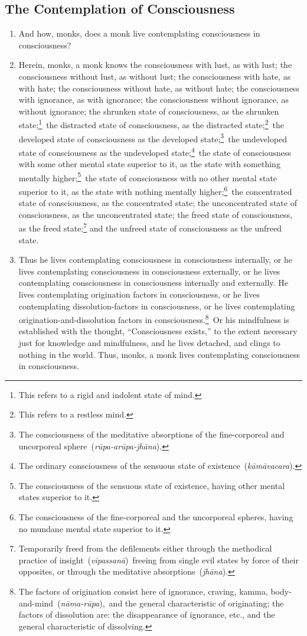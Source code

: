 \documentclass[a4 paper, 12pt]{article}
\begin{document}
\subsection*{The Contemplation of Consciousness}
\begin{enumerate}[resume]
\item And how, monks, does a monk live contemplating consciousness in consciousness?
\item Herein, monks, a monk knows the consciousness with lust, as with lust; the consciousness without lust, as without lust; the consciousness with hate, as with hate; the consciousness without hate, as without hate; the consciousness with ignorance, as with ignorance; the consciousness without ignorance, as without ignorance; the shrunken state of consciousness, as the shrunken state;\footnote{This refers to a rigid and indolent state of mind.} the distracted state of consciousness, as the distracted state;\footnote{This refers to a restless mind.} the developed state of consciousness as the developed state;\footnote{The consciousness of the meditative absorptions of the fine-corporeal and uncorporeal sphere (\textit{rūpa-arūpa-jhāna}).} the undeveloped state of consciousness as the undeveloped state;\footnote{The ordinary consciousness of the sensuous state of existence (\textit{kāmāvacara}).} the state of consciousness with some other mental state superior to it, as the state with something mentally higher;\footnote{The consciousness of the sensuous state of existence, having other mental states superior to it.} the state of consciousness with no other mental state superior to it, as the state with nothing mentally higher;\footnote{The consciousness of the fine-corporeal and the uncorporeal spheres, having no mundane mental state superior to it.} the concentrated state of consciousness, as the concentrated state; the unconcentrated state of consciousness, as the unconcentrated state; the freed state of consciousness, as the freed state;\footnote{Temporarily freed from the defilements either through the methodical practice of insight (\textit{vipassanā}) freeing from single evil states by force of their opposites, or through the meditative absorptions (\textit{jhāna}).} and the unfreed state of consciousness as the unfreed state.
\item Thus he lives contemplating consciousness in consciousness internally, or he lives contemplating consciousness in consciousness externally, or he lives contemplating  consciousness in consciousness internally and externally. He lives contemplating origination factors in consciousness, or he lives contemplating dissolution-factors in consciousness, or he lives contemplating origination-and-dissolution factors in consciousness.\footnote{The factors of origination consist here of ignorance, craving, kamma, body-and-mind (\textit{nāma-rūpa}), and the general characteristic of originating; the factors of dissolution are: the disappearance of ignorance, etc., and the general characteristic of dissolving.} Or his mindfulness is established with the thought, “Consciousness exists,” to the extent necessary just for knowledge and mindfulness, and he lives detached, and clings to nothing in the world. Thus, monks, a monk lives contemplating consciousness in consciousness.
\end{enumerate}
\end{document}
